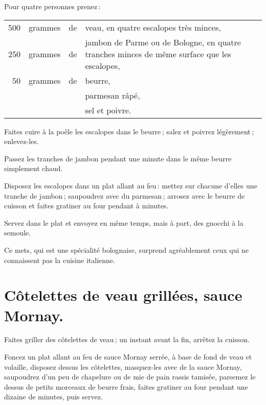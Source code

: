 Pour quatre personnes prenez :

\medskip

\footnotesize
\begin{longtable}{rrrp{16em}}
    500 & grammes & de & veau, en quatre escalopes très minces,                                           \\
    250 & grammes & de & jambon de Parme ou de Bologne, en quatre
                         tranches minces de même surface que les escalopes,                               \\
     50 & grammes & de & beurre,                                                                          \\
        &         &    & parmesan râpé,                                                                   \\
        &         &    & sel et poivre.                                                                   \\
\end{longtable}
\normalsize

Faites cuire à la poêle les escalopes dans le beurre ; salez et poivrez
légèrement ; enlevez-les.

Passez les tranches de jambon pendant une minute dans le même beurre simplement
chaud.

Disposez les escalopes dans un plat allant au feu : mettez sur chacune d'elles
une tranche de jambon ; saupoudrez avec du parmesan ; arrosez avec le beurre de
cuisson et faites gratiner au four pendant {\mmm} à {\mmm} minutes.

Servez dans le plat et envoyez en même temps, mais à part, des gnocchi à la
semoule.

Ce mets, qui est une spécialité bolognaise, surprend agréablement ceux qui ne
connaissent pas la cuisine italienne.

\section*{\centering Côtelettes de veau grillées, sauce Mornay.}
{}

Faites griller des côtelettes de veau ; un instant avant la fin, arrêtez la
cuisson.

Foncez un plat allant au feu de sauce Mornay serrée, à base de fond de veau
et volaille, disposez dessus les côtelettes, masquez-les avec de la sauce Mornay,
saupoudrez d'un peu de chapelure ou de mie de pain rassis tamisée, parsemez le
dessus de petits morceaux de beurre frais, faites gratiner au four pendant une
dizaine de minutes, puis servez.

